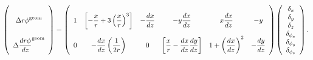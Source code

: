 \begin{equation}
\renewcommand{\arraystretch}{3}
\left(\begin{array}{c}
{\Delta r\phi}^{\mbox{\scriptsize geom}} \\
{\Delta \dfrac{dr\phi}{dz}}^{\mbox{\scriptsize geom}} \\
\end{array}\right)
=
{\renewcommand{\arraystretch}{3}
\left(\begin{array}{c c c c c c}
1 & \left[ -\dfrac{x}{r} + 3\left(\dfrac{x}{r}\right)^3 \right] & -\dfrac{dx}{dz}  & -y \dfrac{dx}{dz} & x \dfrac{dx}{dz} & -y \\
0 & -\dfrac{dx}{dz} \left(\dfrac{1}{2r}\right) & 0 & \left[ \dfrac{x}{r} - \dfrac{dx}{dz}\dfrac{dy}{dz} \right] & 1 + \left(\dfrac{dx}{dz}\right)^2 & -\dfrac{dy}{dz}
\end{array}\right)}
\renewcommand{\arraystretch}{1}
\left(\begin{array}{c}
\delta_x \\
\delta_y \\
\delta_z \\
\delta_{\phi_x} \\
\delta_{\phi_y} \\
\delta_{\phi_z}
\end{array}\right) \mbox{.}
\label{eqn:cscmatrix}
\end{equation}


